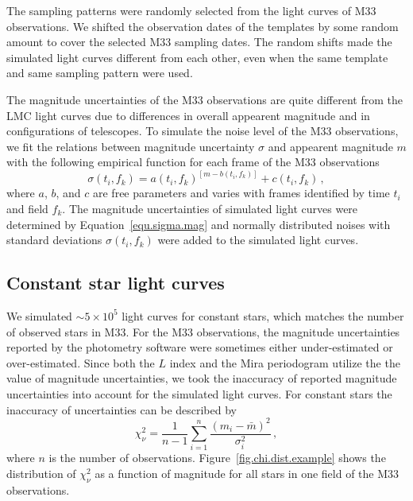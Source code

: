 The sampling patterns were randomly selected from the light curves of M33 observations. We shifted the observation dates of the templates by some random amount to cover the selected M33 sampling dates. The random shifts made the simulated light curves different from each other, even when the same template and same sampling pattern were used.

The magnitude uncertainties of the M33 observations are quite different from the LMC light curves due to differences in overall appearent magnitude and in configurations of telescopes. To simulate the noise level of the M33 observations, we fit the relations between magnitude uncertainty $\sigma$ and appearent magnitude $m$ with the following empirical function for each frame of the M33 observations
\begin{equation}
\sigma(t_i,f_k) = a(t_i,f_k)^{[m-b(t_i,f_k)]} + c(t_i,f_k)\,, \label{equ.sigma.mag}
\end{equation}
where $a$, $b$, and $c$ are free parameters and varies with frames identified by time $t_i$ and field $f_k$. The magnitude uncertainties of simulated light curves were determined by Equation~\ref{equ.sigma.mag} and normally distributed noises with standard deviations $\sigma(t_i,f_k)$ were added to the simulated light curves.

\subsection{Constant star light curves}

We simulated $\sim 5\times 10^5$ light curves for constant stars, which matches the number of observed stars in M33. For the M33 observations, the magnitude uncertainties reported by the photometry software were sometimes either under-estimated or over-estimated. Since both the $L$ index and the Mira periodogram utilize the the value of magnitude uncertainties, we took the inaccuracy of reported magnitude uncertainties into account for the simulated light curves. For constant stars the inaccuracy of uncertainties can be described by
\begin{equation}
\chi_\nu^2 = \frac{1}{n-1}\sum_{i=1}^n\frac{(m_i-\bar m)^2}{\sigma_i^2}\,,
\end{equation}
where $n$ is the number of observations. Figure~\ref{fig.chi.dist.example} shows the distribution of $\chi_\nu^2$ as a function of magnitude for all stars in one field of the M33 observations.

